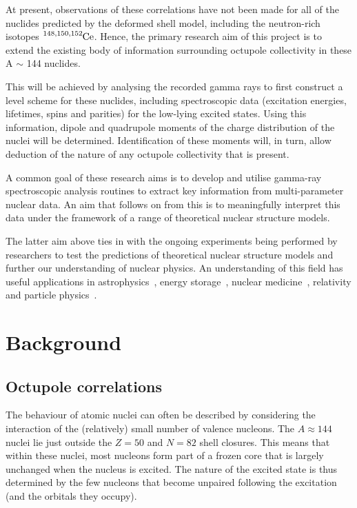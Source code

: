 \documentclass[12pt,a4paper]{article}
\begin{document}
\medskip
\noindent
At present, observations of these correlations have not been made for all of the nuclides predicted by the deformed shell model, including the neutron-rich isotopes $\ce{^{148,150,152}Ce}$.
Hence, the primary research aim of this project is to extend the existing body of information surrounding octupole collectivity in these A $\sim$ 144 nuclides.

\medskip
\noindent
This will be achieved by analysing the recorded gamma rays to first construct a level scheme for these nuclides, including spectroscopic data (excitation energies, lifetimes, spins and parities) for the low-lying excited states.
Using this information, dipole and quadrupole moments of the charge distribution of the nuclei will be determined.
Identification of these moments will, in turn, allow deduction of the nature of any octupole collectivity that is present.%

\medskip
\noindent
A common goal of these research aims is to develop and utilise gamma-ray spectroscopic analysis routines to extract key information from multi-parameter nuclear data.
An aim that follows on from this is to meaningfully interpret this data under the framework of a range of theoretical nuclear structure models.

\medskip
\noindent
The latter aim above ties in with the ongoing experiments being performed by researchers to test the predictions of theoretical nuclear structure models and further our understanding of nuclear physics.
An understanding of this field has useful applications in astrophysics~\cite{hayakawa_neutron_2009}, energy storage~\cite{shaffer_innovations_2018}, nuclear medicine~\cite{krane_introductory_1987}, relativity and particle physics~\cite{casten_nuclear_1990}.



\section*{Background}

\subsection*{Octupole correlations}
The behaviour of atomic nuclei can often be described by considering the interaction of the (relatively) small number of valence nucleons. The $A \approx 144$ nuclei lie just outside the $Z = 50$ and $N = 82$ shell closures.
This means that within these nuclei, most nucleons form part of a frozen core that is largely unchanged when the nucleus is excited.
The nature of the excited state is thus determined by the few nucleons that become unpaired following the excitation (and the orbitals they occupy).
\end{document}
